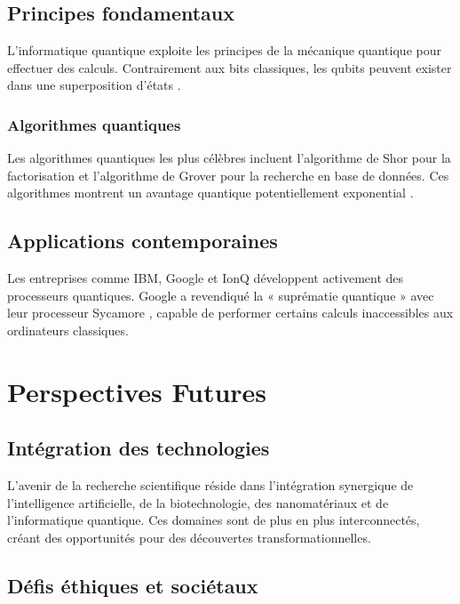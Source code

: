 \documentclass[12pt,a4paper,twoside,openright,openany]{book}
\begin{document}
	\section{Principes fondamentaux}
	
	L'informatique quantique exploite les principes de la mécanique quantique pour effectuer des calculs. Contrairement aux bits classiques, les qubits peuvent exister dans une superposition d'états \cite{Shor1994}.
	
	\subsection{Algorithmes quantiques}
	
	Les algorithmes quantiques les plus célèbres incluent l'algorithme de Shor pour la factorisation et l'algorithme de Grover pour la recherche en base de données. Ces algorithmes montrent un avantage quantique potentiellement exponential \cite{Grover1996}.
	
	\section{Applications contemporaines}
	
	Les entreprises comme IBM, Google et IonQ développent activement des processeurs quantiques. Google a revendiqué la « suprématie quantique » avec leur processeur Sycamore \cite{Arute2019}, capable de performer certains calculs inaccessibles aux ordinateurs classiques.
	
	\newpage
	
	\chapter{Perspectives Futures}
	
	\section{Intégration des technologies}
	
	L'avenir de la recherche scientifique réside dans l'intégration synergique de l'intelligence artificielle, de la biotechnologie, des nanomatériaux et de l'informatique quantique. Ces domaines sont de plus en plus interconnectés, créant des opportunités pour des découvertes transformationnelles.
	
	\section{Défis éthiques et sociétaux}
	
\end{document}
